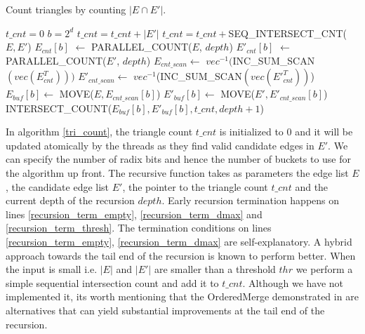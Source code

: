 \documentclass[conference]{IEEEtran}
\begin{document}
\begin{algorithm}
  \caption{Count triangles by counting $|E \cap E'|$.\label{tri_count}}
  \begin{algorithmic}[1]
    \Statex
    \State $t\_cnt = 0$ 
    \State $b=2^d$ 
       \label{recursion_term_empty}
	\State \Return{}
      \EndIf
	\State $t\_cnt = t\_cnt + |E'|$
	\State \Return{}
      \EndIf
	\State $t\_cnt = t\_cnt +$SEQ\_INTERSECT\_CNT($E, E'$)
	\State \Return{}
      \EndIf
      \State $E_{cnt}[b]$ $\gets$ PARALLEL\_COUNT($E$, $depth$) \label{par_cnt_e}
      \State $E'_{cnt}[b]$ $\gets$ PARALLEL\_COUNT($E'$, $depth$) \label{par_cnt_e_prime}
      \State $E_{cnt\_scan} \gets$ $vec^{-1}($INC\_SUM\_SCAN$(vec(E^T_{cnt})))$ \label{inc_sum_scan_e_cnt}
      \State $E'_{cnt\_scan} \gets$ $vec^{-1}$(INC\_SUM\_SCAN$(vec(E'^T_{cnt}))$) \label{inc_sum_scan_e_prime_cnt}
	\State $E_{buf}[b] \gets$ MOVE($E, E_{cnt\_scan}[b]$) \label{move_e_cnt_scan}
      \EndFor
	\State $E'_{buf}[b] \gets$ MOVE($E', E'_{cnt\_scan}[b]$) \label{move_e_prime_cnt_scan}
      \EndFor
	\State \footnotesize{INTERSECT\_COUNT($E_{buf}[b], E'_{buf}[b], t\_cnt, depth+1$)} \label{recursion_call}
      \EndFor
    \EndFunction
  \end{algorithmic}
\end{algorithm}

In algorithm \ref{tri_count}, the triangle count $t\_cnt$ is initialized to 0 and it will be updated atomically by the threads as they find valid candidate edges in $E'$. We can specify the number of radix bits and hence the number of buckets to use for the algorithm up front. The recursive function takes as parameters the edge list $E$, the candidate edge list $E'$, the pointer to the triangle count $t\_cnt$ and the current depth of the recursion $depth$. Early recursion termination happens on lines \ref{recursion_term_empty}, \ref{recursion_term_dmax} and \ref{recursion_term_thresh}. The termination conditions on lines \ref{recursion_term_empty}, \ref{recursion_term_dmax} are self-explanatory. A hybrid approach towards the tail end of the recursion is known to perform better\cite{b16}. When the input is small i.e. $|E|$ and $|E'|$ are smaller than a threshold $thr$ we perform a simple sequential intersection count and add it to $t\_cnt$. Although we have not implemented it, its worth mentioning that the OrderedMerge demonstrated in \cite{b17, b18} are alternatives that can yield substantial improvements at the tail end of the recursion.
\end{document}
